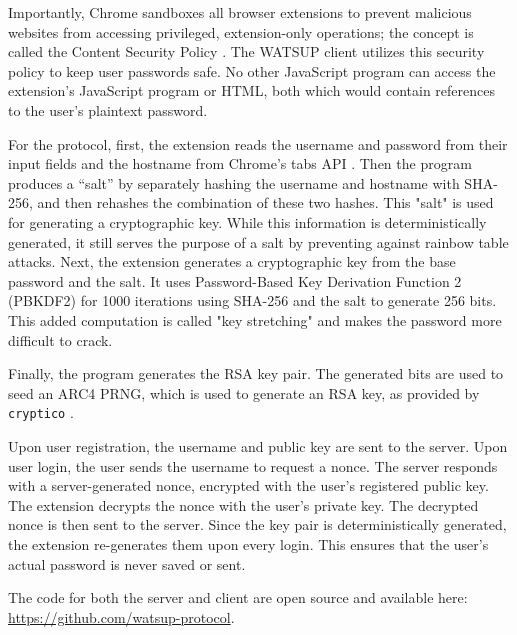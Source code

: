 Importantly, Chrome sandboxes all browser extensions to prevent malicious websites from accessing privileged, extension-only operations; the concept is called the Content Security Policy \cite{Google:2017:contentSecurityPolicy}. The WATSUP client utilizes this security policy to keep user passwords safe. No other JavaScript program can access the extension's JavaScript program or HTML, both which would contain references to the user’s plaintext password.

For the protocol, first, the extension reads the username and password from their input fields and the hostname from Chrome's tabs API \cite{Google:2017:tabs}. Then the program produces a “salt” by separately hashing the username and hostname with SHA-256, and then rehashes the combination of these two hashes. This "salt" is used for generating a cryptographic key. While this information is deterministically generated, it still serves the purpose of a salt by preventing against rainbow table attacks. Next, the extension generates a cryptographic key from the base password and the salt. It uses Password-Based Key Derivation Function 2 (PBKDF2) for 1000 iterations using SHA-256 and the salt to generate 256 bits. This added computation is called "key stretching" and makes the password more difficult to crack.

Finally, the program generates the RSA key pair. The generated bits are used to seed an ARC4 PRNG, which is used to generate an RSA key, as provided by \texttt{cryptico} \cite{Terrell:2017}.

Upon user registration, the username and public key are sent to the server. Upon user login, the user sends the username to request a nonce. The server responds with a server-generated nonce, encrypted with the user's registered public key. The extension decrypts the nonce with the user's private key. The decrypted nonce is then sent to the server. Since the key pair is deterministically generated, the extension re-generates them upon every login. This ensures that the user's actual password is never saved or sent.

The code for both the server and client are open source and available here: \url{https://github.com/watsup-protocol}.